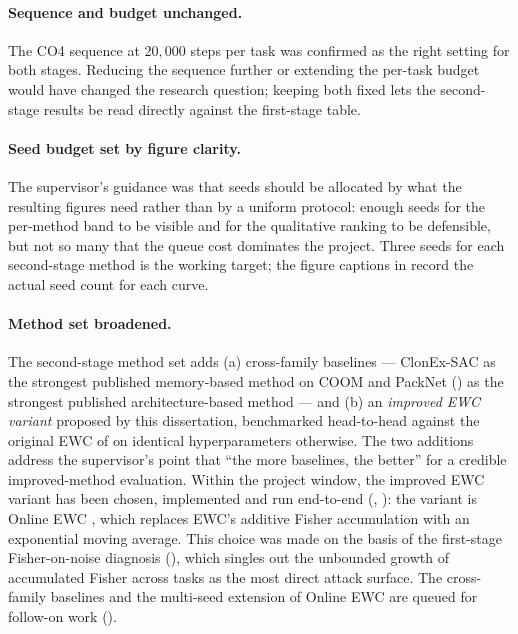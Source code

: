\paragraph{Sequence and budget unchanged.}
The CO4 sequence at $20{,}000$ steps per task was confirmed as
the right setting for both stages. Reducing the sequence
further or extending the per-task budget would have changed the
research question; keeping both fixed lets the second-stage
results be read directly against the first-stage table.

\paragraph{Seed budget set by figure clarity.}
The supervisor's guidance was that seeds should be allocated
by what the resulting figures need rather than by a uniform
protocol: enough seeds for the per-method band to be visible
and for the qualitative ranking to be defensible, but not so
many that the queue cost dominates the project. Three seeds for
each second-stage method is the working target; the figure
captions in  record the actual seed count for
each curve.

\paragraph{Method set broadened.}
The second-stage method set adds (a) cross-family baselines
--- ClonEx-SAC \citep{daniels2022clonex} as the strongest
published memory-based method on COOM and PackNet
(\citealp{mallya2018packnet}) as the strongest published
architecture-based method --- and (b) an \emph{improved EWC
variant} proposed by this dissertation, benchmarked
head-to-head against the original EWC of
\citet{kirkpatrick2017ewc} on identical hyperparameters
otherwise. The two additions address the supervisor's point
that ``the more baselines, the better'' for a credible
improved-method evaluation. Within the project window, the
improved EWC variant has been chosen, implemented and run
end-to-end (, ):
the variant is Online EWC \citep{schwarz2018progress}, which
replaces EWC's additive Fisher accumulation with an
exponential moving average. This choice was made on the basis
of the first-stage Fisher-on-noise diagnosis
(), which singles out the unbounded
growth of accumulated Fisher across tasks as the most direct
attack surface. The cross-family baselines and the multi-seed
extension of Online EWC are queued for follow-on work
().
